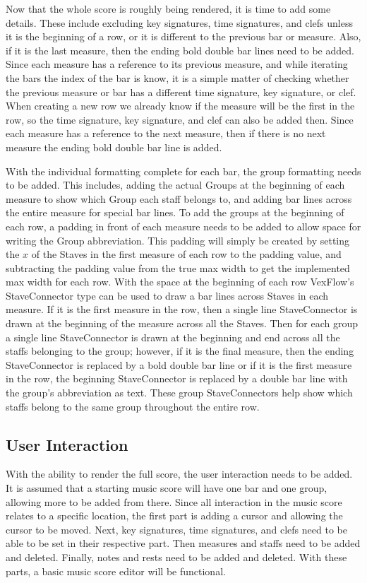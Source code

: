 \documentclass[letterpaper,12pt]{article}
\begin{document}
Now that the whole score is roughly being rendered, it is time to add some details. These include excluding key
signatures, time signatures, and clefs unless it is the beginning of a row, or it is different to the previous bar or
measure. Also, if it is the last measure, then the ending bold double bar lines need to be added. Since each measure has a
reference to its previous measure, and while iterating the bars the index of the bar is know, it is a simple
matter of checking whether the previous measure or bar has a different time signature, key signature, or clef. When
creating a new row we already know if the measure will be the first in the row, so the time signature, key signature,
and clef can also be added then. Since each measure has a reference to the next measure, then if there is no next
measure the ending bold double bar line is added.

With the individual formatting complete for each bar, the group formatting needs to be added. This includes, adding
the actual Groups at the beginning of each measure to show which Group each staff belongs to, and adding bar lines
across the entire measure for special bar lines. To add the groups at the beginning of each row, a padding in front of
each measure needs to be added to allow space for writing the Group abbreviation. This padding will simply be created by
setting the $ x $ of the Staves in the first measure of each row to the padding value, and subtracting the padding
value from the true max width to get the implemented max width for each row. With the space at the beginning of each
row VexFlow's StaveConnector type can be used to draw a bar lines across Staves in each measure. If it is the first
measure in the row, then a single line StaveConnector is drawn at the beginning of the measure across all the Staves.
Then for each group a single line StaveConnector is drawn at the beginning and end across all the staffs belonging to
the group; however, if it is the final measure, then the ending StaveConnector is replaced by a bold double bar line or
if it is the first measure in the row, the beginning StaveConnector is replaced by a double bar line with the group's
abbreviation as text. These group StaveConnectors help show which staffs belong to the same group throughout the entire
row.

\subsection{User Interaction}

With the ability to render the full score, the user interaction needs to be added. It is assumed that a starting music
score will have one bar and one group, allowing more to be added from there. Since all interaction in the music score
relates to a specific location, the first part is adding a cursor and allowing the cursor to be moved. Next, key
signatures, time signatures, and clefs need to be able to be set in their respective part. Then measures and staffs need
to be added and deleted. Finally, notes and rests need to be added and deleted. With these parts, a basic music score
editor will be functional.
\end{document}
